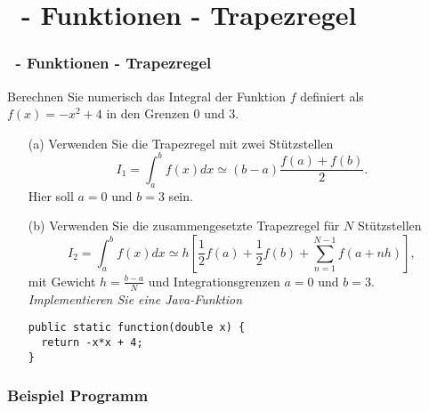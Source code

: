 \def\stitle{\theexercise\ - Funktionen - Trapezregel}
\section{\stitle}
\begin{frame}[fragile]%
    \frametitle{\stitle}

Berechnen Sie numerisch das Integral der Funktion $f$ definiert als $f(x) = -x^2+4$ in den Grenzen $0$ und $3$.
\begin{itemize}
\item[(a)] Verwenden Sie die Trapezregel mit zwei St\"utzstellen
\[
I_1
= \int_a^b f(x)dx
\simeq (b-a)\frac{f(a)+f(b)}{2}
.\]
Hier soll $a=0$ und $b=3$ sein.
\item[(b)] Verwenden Sie die zusammengesetzte Trapezregel für $N$ St\"utzstellen
\[
I_2
= \int_a^b f(x)dx
\simeq h \left[\frac{1}{2}f(a)+\frac{1}{2}f(b)+\sum_{n=1}^{N-1}f\left(a+nh \right)\right]
,\]
mit Gewicht $h = \frac{b-a}{N}$ und Integrationsgrenzen $a=0$ und $b=3$.
\emph{Implementieren Sie eine Java-Funktion}

\begin{lstlisting}[style=Java]
public static function(double x) {
  return -x*x + 4;
}
\end{lstlisting}
\end{itemize}


\end{frame}

\begin{frame}[t]%
  \frametitle{Beispiel Programm}%


\end{frame}